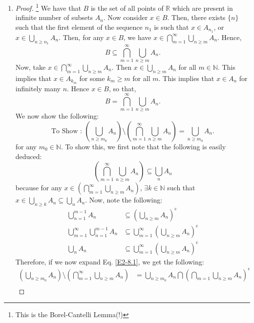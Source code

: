 \documentclass{article}
\theoremstyle{definition}
\theoremstyle{remark}
\theoremstyle{definition}
\theoremstyle{definition}
\theoremstyle{definition}
\newcommand{\bunion}{\bigcup}
\newcommand{\bintrs}{\bigcap}
\newcommand{\R}{\mathbb{R}}
\newcommand{\N}{\mathbb{N}}
\newcommand{\comp}[1]{#1^{\text{c}}}
\begin{document}
\begin{enumerate}
\item {\begin{proof}\footnote{This is the Borel-Cantelli Lemma(!)}
		We have that $ B $ is the set of all points of $ \R $ which are present in infinite number of subsets $ A_n $. Now consider $ x\in B $. Then, there exists $ \{n\} $ such that the first element of the sequence $ n_1 $ is such that $ x\in A_{n_1} $, or $ x\in \bunion_{n\ge n_1} A_n $. Then, for any $ x\in B $, we have $ x\in\bintrs_{m=1}^{\infty}  \bunion_{n\ge m} A_n $. Hence,
		\[B\subseteq \bintrs_{m=1}^{\infty}  \bunion_{n\ge m} A_n.\]
		Now, take $ x\in \bintrs_{m=1}^{\infty} \bunion_{n\ge m} A_n $. Then $ x\in \bunion_{n\ge m} A_n $ for all $ m\in \N $. This implies that $ x\in A_{k_m} $ for some $ k_m \ge m $ for all $ m $. This implies that $ x\in A_n $ for infinitely many $ n $. Hence $ x\in B $, so that,
		\[B = \bintrs_{m=1}^{\infty}\bunion_{n\ge m} A_n.\]
		We now show the following:
		\begin{equation}
			\label{E2-8.1}
		\text{To Show : }	\left (\bunion_{n\ge m_0} A_n\right ) \setminus \left (\bintrs_{m=1}^{\infty} \bunion_{n\ge m} A_n\right ) = \bunion_{n\ge m_0} A_n.
		\end{equation}
		for any $ m_0 \in \N $.
		To show this, we first note that the following is easily deduced:
		\[\left (\bintrs_{m=1}^{\infty} \bunion_{n\ge m} A_n\right ) \subseteq \bunion_n A_n\]
		because for any $ x\in \left (\bintrs_{m=1}^{\infty} \bunion_{n\ge m} A_n\right ) $, $ \exists k \in\N$ such that $ x \in  \bunion_{n\ge k} A_n \subseteq \bunion_{n} A_n$. Now, note the following:
		\begin{equation}
			\label{E2-8.2}
			\begin{split}
				\bunion_{n=1}^{m-1} A_n &\subseteq \comp{\left(\bunion_{n\ge m} A_n\right )}\\
				\bunion_{m=1}^{\infty}\bunion_{n=1}^{m-1} A_n&\subseteq \bunion_{m=1}^{\infty} \comp{\left (\bunion_{n\ge m} A_n\right )}\\
				\bunion_{n} A_n &\subseteq \bunion_{m=1}^{\infty} \comp{\left (\bunion_{n\ge m} A_n\right )}
			\end{split}
		\end{equation} 
	Therefore, if we now expand Eq. \ref{E2-8.1}, we get the following:
	\begin{equation}\label{E2-8.3}
		\begin{split}
			\left (\bunion_{n\ge m_0} A_n\right ) \setminus \left (\bintrs_{m=1}^{\infty} \bunion_{n\ge m} A_n\right ) &= \bunion_{n\ge m_0} A_n \bintrs \comp{\left (\bintrs_{m=1}\bunion_{n\ge m} A_n\right )}\\

\end{split}
\end{equation}
\end{proof}}
\end{enumerate}
\end{document}
